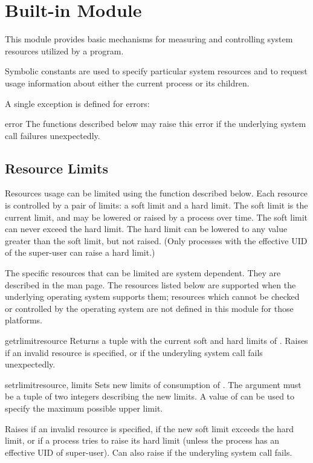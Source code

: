 \section{Built-in Module }
\label{module-resource}

This module provides basic mechanisms for measuring and controlling
system resources utilized by a program.

Symbolic constants are used to specify particular system resources and
to request usage information about either the current process or its
children.

A single exception is defined for errors:


\begin{excdesc}{error}
  The functions described below may raise this error if the underlying
  system call failures unexpectedly.
\end{excdesc}

\subsection{Resource Limits}

Resources usage can be limited using the  function
described below. Each resource is controlled by a pair of limits: a
soft limit and a hard limit. The soft limit is the current limit, and
may be lowered or raised by a process over time. The soft limit can
never exceed the hard limit. The hard limit can be lowered to any
value greater than the soft limit, but not raised. (Only processes with
the effective UID of the super-user can raise a hard limit.)

The specific resources that can be limited are system dependent. They
are described in the  man page.  The resources
listed below are supported when the underlying operating system
supports them; resources which cannot be checked or controlled by the
operating system are not defined in this module for those platforms.

\begin{funcdesc}{getrlimit}{resource}
  Returns a tuple  with the current
  soft and hard limits of . Raises  if
  an invalid resource is specified, or  if the
  underyling system call fails unexpectedly.
\end{funcdesc}

\begin{funcdesc}{setrlimit}{resource, limits}
  Sets new limits of consumption of . The 
  argument must be a tuple  of two
  integers describing the new limits. A value of  can be used to
  specify the maximum possible upper limit.

  Raises  if an invalid resource is specified,
  if the new soft limit exceeds the hard limit, or if a process tries
  to raise its hard limit (unless the process has an effective UID of
  super-user).  Can also raise  if the underyling
  system call fails.
\end{funcdesc}

